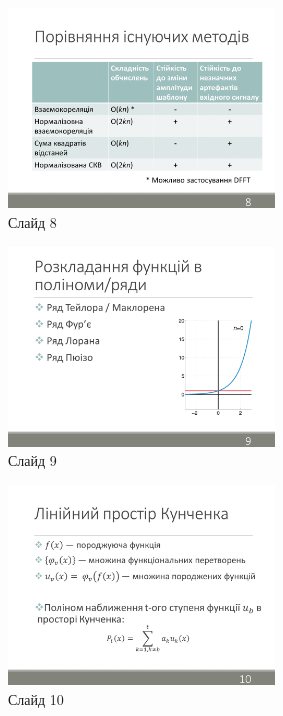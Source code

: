 \documentclass[pdftex]{thesis_utf8}
\begin{document}
\begin{figure}[h]
    \centering
    \includegraphics[width=0.63\textwidth]{slides/slide08.png}
    \caption{Слайд 8}
\end{figure}
\clearpage

\begin{figure}[h]
    \centering
    \includegraphics[width=0.63\textwidth]{slides/slide09.png}
    \caption{Слайд 9}
\end{figure}

\begin{figure}[h]
    \centering
    \includegraphics[width=0.63\textwidth]{slides/slide10.png}
    \caption{Слайд 10}
\end{figure}
\clearpage
\end{document}
